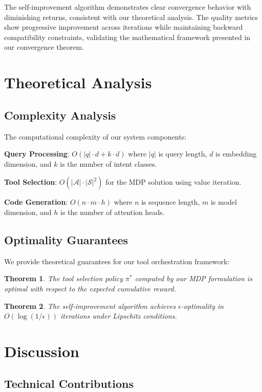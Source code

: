 \documentclass[10pt]{article}
\newtheorem{theorem}{Theorem}
\begin{document}
The self-improvement algorithm demonstrates clear convergence behavior with diminishing returns, consistent with our theoretical analysis. The quality metrics show progressive improvement across iterations while maintaining backward compatibility constraints, validating the mathematical framework presented in our convergence theorem.

\section{Theoretical Analysis}

\subsection{Complexity Analysis}

The computational complexity of our system components:

\textbf{Query Processing}: $O(|q| \cdot d + k \cdot d)$ where $|q|$ is query length, $d$ is embedding dimension, and $k$ is the number of intent classes.

\textbf{Tool Selection}: $O(|\mathcal{A}| \cdot |\mathcal{S}|^2)$ for the MDP solution using value iteration.

\textbf{Code Generation}: $O(n \cdot m \cdot h)$ where $n$ is sequence length, $m$ is model dimension, and $h$ is the number of attention heads.

\subsection{Optimality Guarantees}

We provide theoretical guarantees for our tool orchestration framework:

\begin{theorem}
The tool selection policy $\pi^*$ computed by our MDP formulation is optimal with respect to the expected cumulative reward.
\end{theorem}

\begin{theorem}
The self-improvement algorithm achieves $\epsilon$-optimality in $O(\log(1/\epsilon))$ iterations under Lipschitz conditions.
\end{theorem}

\section{Discussion}

\subsection{Technical Contributions}
\end{document}
